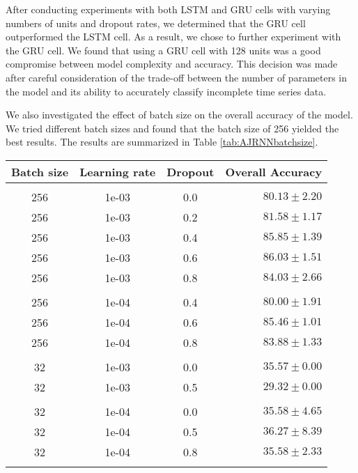 After conducting experiments with both LSTM and GRU cells with varying numbers of units and dropout rates, we determined that the GRU cell outperformed the LSTM cell.
As a result, we chose to further experiment with the GRU cell. 
We found that using a GRU cell with 128 units was a good compromise between model complexity and accuracy. 
This decision was made after careful consideration of the trade-off between the number of parameters in the model and its ability to accurately classify incomplete time series data.

We also investigated the effect of batch size on the overall accuracy of the model.
We tried different batch sizes and found that the batch size of 256 yielded the best results.
The results are summarized in Table \ref{tab:AJRNNbatchsize}.

\begin{table}[H]
  \centering
  \begin{tabular}{cccr} 
      Batch size & Learning rate & Dropout & Overall Accuracy\\[0.2cm] 
      \hline \\[-0.2cm]
      256 &   1e-03 &   0.0 & $80.13 \pm 2.20$\\
      256 &   1e-03 &   0.2 & $81.58 \pm 1.17$\\
      256 &   1e-03 &   0.4 & $85.85 \pm 1.39$\\
      256 &   1e-03 &   0.6 & $\mathbf{86.03 \pm 1.51}$\\
      256 &   1e-03 &   0.8 & $84.03 \pm 2.66$\\[0.05cm] \hline \\[-0.25cm]

      256 &   1e-04 &   0.4 & $80.00 \pm 1.91$\\
      256 &   1e-04 &   0.6 & $85.46 \pm 1.01$\\
      256 &   1e-04 &   0.8 & $83.88 \pm 1.33$\\[0.05cm] \hline \\[-0.25cm]

      32  &   1e-03 & 0.0 & $35.57 \pm 0.00$\\
      32  &   1e-03 & 0.5 & $29.32 \pm 0.00$\\[0.05cm] \hline \\[-0.25cm]

      32  &   1e-04 & 0.0 & $35.58 \pm 4.65$\\
      32  &   1e-04 & 0.5 & $36.27 \pm 8.39$\\
      32  &   1e-04 & 0.8 & $35.58 \pm 2.33$\\[0.05cm] \hline \\[-0.25cm]


\end{tabular}
\end{table}
